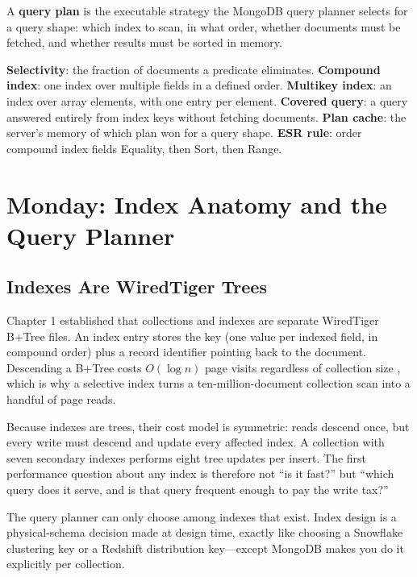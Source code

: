 \begin{definitionbox}
A \textbf{query plan} is the executable strategy the MongoDB query planner selects for a query shape: which index to scan, in what order, whether documents must be fetched, and whether results must be sorted in memory.
\end{definitionbox}

\begin{keyterms}
\textbf{Selectivity}: the fraction of documents a predicate eliminates. \textbf{Compound index}: one index over multiple fields in a defined order. \textbf{Multikey index}: an index over array elements, with one entry per element. \textbf{Covered query}: a query answered entirely from index keys without fetching documents. \textbf{Plan cache}: the server's memory of which plan won for a query shape. \textbf{ESR rule}: order compound index fields Equality, then Sort, then Range.
\end{keyterms}

\section{Monday: Index Anatomy and the Query Planner}
\subsection{Indexes Are WiredTiger Trees}
Chapter 1 established that collections and indexes are separate WiredTiger B+Tree files. An index entry stores the key (one value per indexed field, in compound order) plus a record identifier pointing back to the document. Descending a B+Tree costs $O(\log n)$ page visits regardless of collection size \cite{bayer1972organization}, which is why a selective index turns a ten-million-document collection scan into a handful of page reads.

Because indexes are trees, their cost model is symmetric: reads descend once, but every write must descend and update every affected index. A collection with seven secondary indexes performs eight tree updates per insert. The first performance question about any index is therefore not ``is it fast?'' but ``which query does it serve, and is that query frequent enough to pay the write tax?''

\begin{notebox}
The query planner can only choose among indexes that exist. Index design is a physical-schema decision made at design time, exactly like choosing a Snowflake clustering key or a Redshift distribution key---except MongoDB makes you do it explicitly per collection.
\end{notebox}

